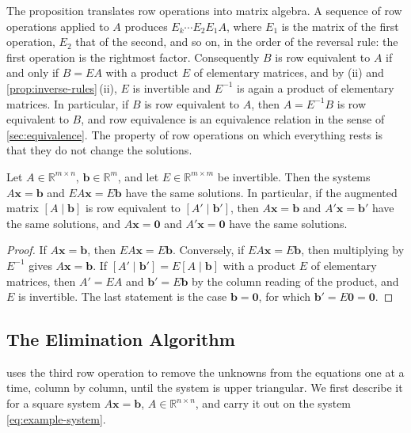 The proposition translates row operations into matrix algebra. A sequence of row operations applied to $A$ produces $E_k\cdots E_2E_1A$, where $E_1$ is the matrix of the first operation, $E_2$ that of the second, and so on, in the order of the reversal rule: the first operation is the rightmost factor. Consequently $B$ is row equivalent to $A$ if and only if $B=EA$ with a product $E$ of elementary matrices, and by (ii) and \cref{prop:inverse-rules}\,(ii), $E$ is invertible and $E^{-1}$ is again a product of elementary matrices. In particular, if $B$ is row equivalent to $A$, then $A=E^{-1}B$ is row equivalent to $B$, and row equivalence is an equivalence relation in the sense of \cref{sec:equivalence}. The property of row operations on which everything rests is that they do not change the solutions.

\begin{theorem}
\label{thm:row-equivalence}
Let $A\in\mathbb R^{m\times n}$, $\mathbf b\in\mathbb R^m$, and let $E\in\mathbb R^{m\times m}$ be invertible. Then the systems $A\mathbf x=\mathbf b$ and $EA\mathbf x=E\mathbf b$ have the same solutions. In particular, if the augmented matrix $[A\mid\mathbf b]$ is row equivalent to $[A'\mid\mathbf b']$, then $A\mathbf x=\mathbf b$ and $A'\mathbf x=\mathbf b'$ have the same solutions, and $A\mathbf x=\mathbf 0$ and $A'\mathbf x=\mathbf 0$ have the same solutions.
\end{theorem}

\begin{proof}
If $A\mathbf x=\mathbf b$, then $EA\mathbf x=E\mathbf b$. Conversely, if $EA\mathbf x=E\mathbf b$, then multiplying by $E^{-1}$ gives $A\mathbf x=\mathbf b$. If $[A'\mid\mathbf b']=E[A\mid\mathbf b]$ with a product $E$ of elementary matrices, then $A'=EA$ and $\mathbf b'=E\mathbf b$ by the column reading of the product, and $E$ is invertible. The last statement is the case $\mathbf b=\mathbf 0$, for which $\mathbf b'=E\mathbf 0=\mathbf 0$.
\end{proof}

\subsection{The Elimination Algorithm}

 uses the third row operation to remove the unknowns from the equations one at a time, column by column, until the system is upper triangular. We first describe it for a square system $A\mathbf x=\mathbf b$, $A\in\mathbb R^{n\times n}$, and carry it out on the system \eqref{eq:example-system}.

